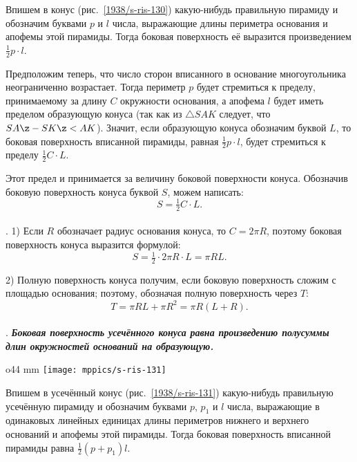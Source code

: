 Впишем в конус (рис.~\ref{1938/s-ris-130}) какую-нибудь правильную пирамиду и обозначим буквами $p$ и $l$ числа, выражающие длины периметра основания и апофемы этой пирамиды.
Тогда боковая поверхность её выразится произведением $\tfrac12 p\cdot l$.

Предположим теперь, что число сторон вписанного в основание многоугольника неограниченно возрастает.
Тогда периметр $p$ будет стремиться к пределу, принимаемому за длину $C$ окружности основания, а апофема $l$ будет иметь пределом образующую конуса (так как из $\triangle SAK$ следует, что $SA\z-SK\z<AK$).
Значит, если образующую конуса обозначим буквой $L$, то боковая поверхность вписанной пирамиды, равная $\tfrac12 p\cdot l$, будет стремиться к пределу $\tfrac12 C\cdot L$. 

Этот предел и принимается за величину боковой поверхности конуса.
Обозначив боковую поверхность конуса буквой $S$, можем написать:
\[S = \tfrac12 C\cdot L.\]

\paragraph{}\label{1938/s115}
. 1) Если $R$ обозначает радиус основания конуса, то $C= 2\pi R$, поэтому боковая поверхность конуса выразится формулой:
\[S
= \tfrac12 \cdot 2\pi R \cdot L
=\pi RL.\]

2) Полную поверхность конуса получим, если боковую поверхность сложим с площадью основания;
поэтому, обозначая полную поверхность через $T$:
\[T= \pi RL + \pi R^2 = \pi R(L + R).\]

\paragraph{}\label{1938/s116}
.
\textbf{\emph{Боковая поверхность усечённого конуса равна произведению полусуммы длин окружностей оснований на образующую.}}

\begin{wrapfigure}{o}{44 mm}
\vskip-0mm
\centering
\texttt{[image: mppics/s-ris-131]}
\caption{}\label{1938/s-ris-131}
\vskip-0mm
\end{wrapfigure}

Впишем в усечённый конус (рис.~\ref{1938/s-ris-131}) какую-нибудь правильную усечённую пирамиду и обозначим буквами $p$, $p_1$ и $l$ числа, выражающие в одинаковых линейных единицах длины периметров нижнего и верхнего оснований и апофемы этой пирамиды.
Тогда боковая поверхность вписанной пирамиды равна $\tfrac12 (p+p_1)l$.

